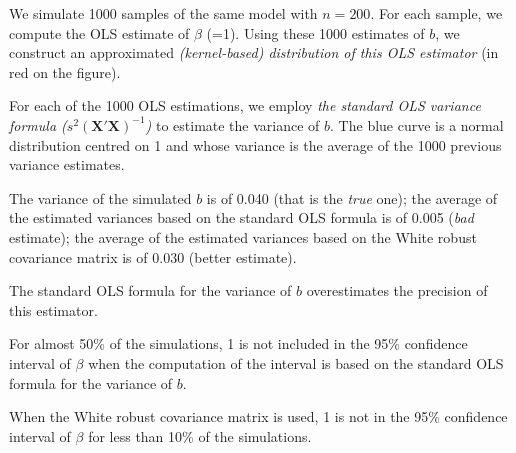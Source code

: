 \documentclass[
]{book}
\theoremstyle{definition}
\theoremstyle{definition}
\theoremstyle{definition}
\theoremstyle{definition}
\theoremstyle{remark}
\begin{document}
We simulate 1000 samples of the same model with \(n=200\). For each sample, we compute the OLS estimate of \(\beta\) (=1). Using these 1000 estimates of \(b\), we construct an approximated \emph{(kernel-based) distribution of this OLS estimator} (in red on the figure).

For each of the 1000 OLS estimations, we employ \emph{the standard OLS variance formula (\(s^2 (\mathbf{X}'\mathbf{X})^{-1}\))} to estimate the variance of \(b\). The blue curve is a normal distribution centred on 1 and whose variance is the average of the 1000 previous variance estimates.

The variance of the simulated \(b\) is of 0.040 (that is the \emph{true} one); the average of the estimated variances based on the standard OLS formula is of 0.005 (\emph{bad} estimate); the average of the estimated variances based on the White robust covariance matrix is of 0.030 (better estimate).

The standard OLS formula for the variance of \(b\) overestimates the precision of this estimator.

For almost 50\% of the simulations, 1 is not included in the 95\% confidence interval of \(\beta\) when the computation of the interval is based on the standard OLS formula for the variance of \(b\).

When the White robust covariance matrix is used, 1 is not in the 95\% confidence interval of \(\beta\) for less than 10\% of the simulations.
\end{document}

